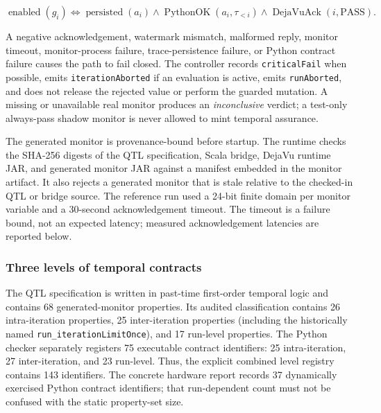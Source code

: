 \begin{equation}
  \operatorname{enabled}(g_i)
  \Longleftrightarrow
  \operatorname{persisted}(a_i)
  \land \operatorname{PythonOK}(a_i,\tau_{<i})
  \land \operatorname{DejaVuAck}(i,\mathrm{PASS}).
  \label{eq:rv-gate}
\end{equation}

A negative acknowledgement, watermark mismatch, malformed reply, monitor
timeout, monitor-process failure, trace-persistence failure, or Python contract
failure causes the path to fail closed.  The controller records
\texttt{criticalFail} when possible, emits \texttt{iterationAborted} if an
evaluation is active, emits \texttt{runAborted}, and does not release the
rejected value or perform the guarded mutation.  A missing or unavailable real
monitor produces an \emph{inconclusive} verdict; a test-only always-pass shadow
monitor is never allowed to mint temporal assurance.

The generated monitor is provenance-bound before startup.  The runtime checks
the SHA-256 digests of the QTL specification, Scala bridge, DejaVu runtime JAR,
and generated monitor JAR against a manifest embedded in the monitor artifact.
It also rejects a generated monitor that is stale relative to the checked-in
QTL or bridge source.  The reference run used a 24-bit finite domain per
monitor variable and a 30-second acknowledgement timeout.  The timeout is a
failure bound, not an expected latency; measured acknowledgement latencies are
reported below.

\subsubsection{Three levels of temporal contracts}

The QTL specification is written in past-time first-order temporal logic and
contains 68 generated-monitor properties.  Its audited classification contains
26 intra-iteration properties, 25 inter-iteration properties (including the
historically named \texttt{run\_iterationLimitOnce}), and 17 run-level
properties.  The Python checker separately registers 75 executable contract
identifiers: 25 intra-iteration, 27 inter-iteration, and 23 run-level.  Thus,
the explicit combined level registry contains 143 identifiers.  The concrete
hardware report records 37 dynamically exercised Python contract identifiers;
that run-dependent count must not be confused with the static property-set
size.

